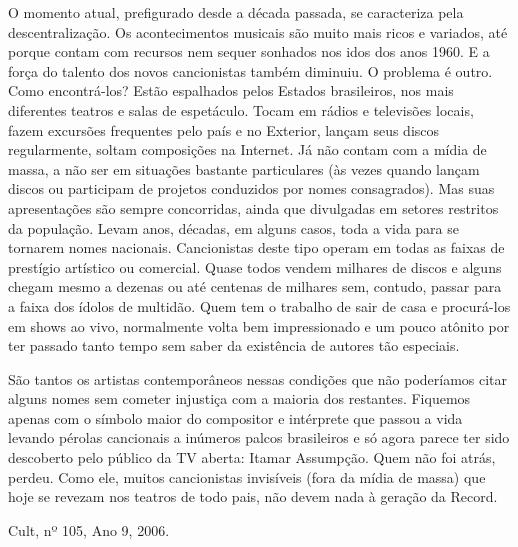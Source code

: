 O momento atual, prefigurado desde a década passada, se caracteriza pela
descentralização. Os acontecimentos musicais são muito mais ricos e
variados, até porque contam com recursos nem sequer sonhados nos idos
dos anos 1960. E a força do talento dos novos cancionistas também
diminuiu. O problema é outro. Como encontrá-los? Estão espalhados pelos
Estados brasileiros, nos mais diferentes teatros e salas de espetáculo.
Tocam em rádios e televisões locais, fazem excursões frequentes pelo
país e no Exterior, lançam seus discos regularmente, soltam composições
na Internet. Já não contam com a mídia de massa, a não ser em situações
bastante particulares (às vezes quando lançam discos ou participam de
projetos conduzidos por nomes consagrados). Mas suas apresentações são
sempre concorridas, ainda que divulgadas em setores restritos da
população. Levam anos, décadas, em alguns casos, toda a vida para se
tornarem nomes nacionais. Cancionistas deste tipo operam em todas as
faixas de prestígio artístico ou comercial. Quase todos vendem milhares
de discos e alguns chegam mesmo a dezenas ou até centenas de milhares
sem, contudo, passar para a faixa dos ídolos de multidão. Quem tem o
trabalho de sair de casa e procurá-los em shows ao vivo, normalmente
volta bem impressionado e um pouco atônito por ter passado tanto tempo
sem saber da existência de autores tão especiais.~

São tantos os artistas contemporâneos nessas condições que não
poderíamos citar alguns nomes sem cometer injustiça com a maioria dos
restantes. Fiquemos apenas com o símbolo maior do compositor e
intérprete que passou a vida levando pérolas cancionais a inúmeros
palcos brasileiros e só agora parece ter sido descoberto pelo público da
TV aberta: Itamar Assumpção. Quem não foi atrás, perdeu. Como ele,
muitos cancionistas invisíveis (fora da mídia de massa) que hoje se
revezam nos teatros de todo pais, não devem nada à geração da Record.

Cult, nº 105, Ano 9, 2006.

